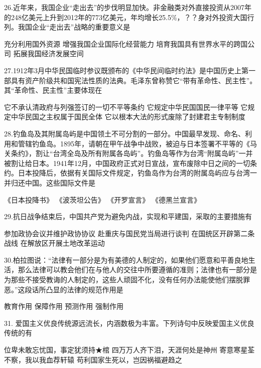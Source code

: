  26.近年来，我国企业“走出去”的步伐明显加快。非金融类对外直接投资从2007年的248亿美元上升到2012年的773亿美元，年均增长25.5\%，？？身对外投资大国行列。我国企业“走出去”战略的重要意义是
\begin{choices}
	  充分利用国外资源
	  增强我国企业国际化经营能力
	  培育我国具有世界水平的跨国公司
	  拓展我国经济发展空间
\end{choices}

 27.1912年3月中华民国临时参议既颁布的《中华民间临时约法》是中国历史上第一部具有资产阶级共和国宪法性质的法典。毛泽东曾称赞它“带有革命性、民主性”。其“革命性、民主性”主要体现在
\begin{choices}
	  它不承认清政府与列强签订的一切不平等条约
	  它规定中华民国国民一律平等
	  它规定中华民国之主权属于国民全体
	  它以根本大法的形式废除了封建君主专制制度
\end{choices}

 28.钓鱼岛及其附属岛屿是中国领土不可分割的一部分。中国最早发现、命名、利用和管辖钓鱼岛。1895年，请朝在甲午战争中战败，被迫与日本签署不平等的《马关条约》，割让“台湾全岛及所有附属各岛屿”。钓鱼岛等作为台湾“附属岛屿”一并被割让给日本。1941年12月，中国政府正式对日宣战，宣布废除中日之间的一切条约。日本投降后，依据有关国际文件规定，钓鱼岛作为台湾的附属岛屿应与台湾一并归还中国。这些国际文件是
\begin{choices}
	  《日本投降书》
	  《波茨坦公告》
	  《开罗宣言》
	  《德黑兰宣言》
\end{choices}

 29.抗日战争结束后，中国共产党为避免内战，实现和平建国，采取的主要措施有
\begin{choices}
	  参加政协会议并维护政协协议
	  赴重庆与国民党当局进行谈判
	  在国统区开辟第二条战线
	  在解放区开展土地改革运动
\end{choices}

 30.柏拉图说：“法律有一部分是为有美德的人制定的，如果他们愿意和平善良地生活，那么法律可以教会他们在与他人的交往中所要遵循的准则；法律也有一部分是为那些不接受教诲的人制定的，这些人顽固不化，没有任何办法能使他们摆脱罪恶。”这段话所凸显的法律的规范作用是
\begin{choices}
	  教育作用
	  保障作用
	  预测作用
	  强制作用
\end{choices}

31. 爱国主义优良传统源远流长，内涵数极为丰富。下列诗句中反映爱国主义优良传统的有
\begin{choices}
	 位卑未敢忘忧国，事定犹须持★棺
	 四万万人齐下泪，天涯何处是神州
	 寄意寒星荃不察，我以我血荐轩辕
	 苟利国家生死以，岂因祸福避趋之
\end{choices}

